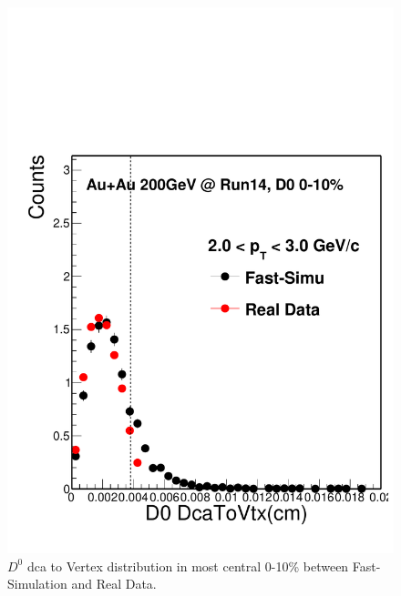 \documentclass[a4paper]{article}
\begin{document}
\begin{figure}[htbp]
\begin{minipage}[htbp]{0.52\linewidth}
\includegraphics[width=1.0\textwidth,angle=0]{fig/D0Dca2Vtx.pdf} 
\caption{ $D^0$ dca to Vertex distribution in most central 0-10\% between Fast-Simulation and Real Data.\label{D0Dca2Vtx}}
\end{minipage}
\end{figure}
\end{document}
